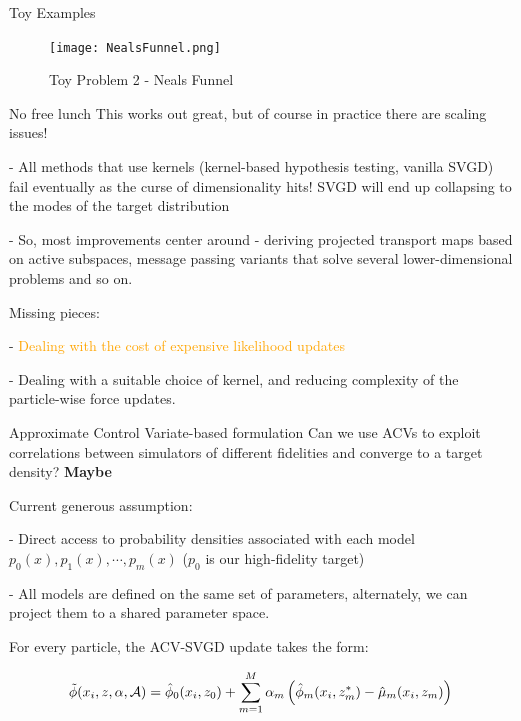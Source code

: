 \documentclass[usenames,dvipsnames]{beamer}
\theoremstyle{definition}
\begin{document}
\begin{frame}{Toy Examples}
    \begin{figure}[H]
        \centering
        \texttt{[image: NealsFunnel.png]}
        \caption{Toy Problem 2 - Neals Funnel}        
    \end{figure}
\end{frame}


\begin{frame}{No free lunch}
    This works out great, but of course in practice there are scaling issues!

    - All methods that use kernels (kernel-based hypothesis testing, vanilla SVGD) fail eventually as the curse of dimensionality hits! SVGD will end up collapsing to the modes of the target distribution

    - So, most improvements center around - deriving projected transport maps based on active subspaces, message passing variants that solve several lower-dimensional problems and so on.

    Missing pieces:

    - \textcolor{orange}{Dealing with the cost of expensive likelihood updates}

    - Dealing with a suitable choice of kernel, and reducing complexity of the particle-wise force updates.
\end{frame}

\begin{frame}{Approximate Control Variate-based formulation}
Can we use ACVs to exploit correlations between simulators of different fidelities and converge to a target density? \textbf{Maybe}


Current generous assumption:

- Direct access to probability densities associated with each model $p_0(x), p_1(x), \cdots, p_m(x)$ ($p_0$ is our high-fidelity target)

- All models are defined on the same set of parameters, alternately, we can project them to a shared parameter space.

For every particle, the ACV-SVGD update takes the form:

\begin{align}
    \Tilde{\phi}(x_i, z,\alpha,\mathcal{A}) &= 
    \hat{\phi}_{0}(x_i, z_{0})+\sum^{M}_{m=1}\alpha_{m}\left( \hat{\phi}_{m}(x_i, z^{\ast}_{m})-\hat{\mu}_{m}(x_i, z_{m}) \right) \nonumber\\ 
\end{align}

\end{frame}
\end{document}
